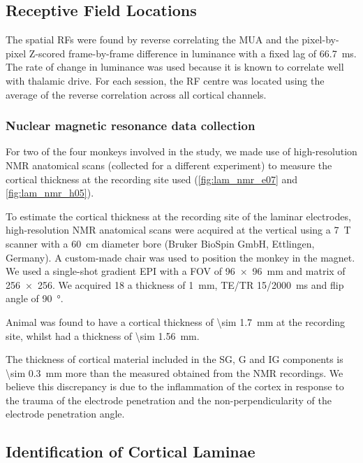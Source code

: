 \subsection{Receptive Field Locations}

The spatial \acp{RF} were found by reverse correlating the \ac{MUA} and the pixel-by-pixel Z-scored frame-by-frame difference in luminance with a fixed lag of \SI{66.7}{\milli\second}.
The rate of change in luminance was used because it is known to correlate well with thalamic drive.
For each session, the \ac{RF} centre was located using the average of the reverse correlation across all cortical channels.


\subsubsection{Nuclear magnetic resonance data collection}

For two of the four monkeys involved in the study, we made use of high-resolution \ac{NMR} anatomical scans (collected for a different experiment) to measure the cortical thickness at the recording site used (\autoref{fig:lam_nmr_e07} and \autoref{fig:lam_nmr_h05}).

To estimate the cortical thickness at the recording site of the laminar electrodes, high-resolution \ac{NMR} anatomical scans were acquired at the vertical using a \SI{7}{T} scanner with a \SI{60}{\centi\metre} diameter bore (Bruker BioSpin GmbH, Ettlingen, Germany).
A custom-made chair was used to position the monkey in the magnet.
We used a single-shot gradient \ac{EPI} with a \ac{FOV} of \SI{96x96}{\milli\metre} and matrix of \num{256x256}.
We acquired 18 a thickness of \SI{1}{\milli\metre}, TE/TR 15/\SI{2000}{\milli\second} and flip angle of \SI{90}{\degree}.

Animal  was found to have a cortical thickness of \SI{\sim 1.7}{mm} at the recording site, whilst  had a thickness of \SI{\sim 1.56}{mm}.

The thickness of cortical material included in the \ac{SG}, \ac{G} and \ac{IG} components is \SI{\sim 0.3}{mm} more than the measured obtained from the \ac{NMR} recordings.
We believe this discrepancy is due to the inflammation of the cortex in response to the trauma of the electrode penetration and the non-perpendicularity of the electrode penetration angle.


\subsection{Identification of Cortical Laminae}

